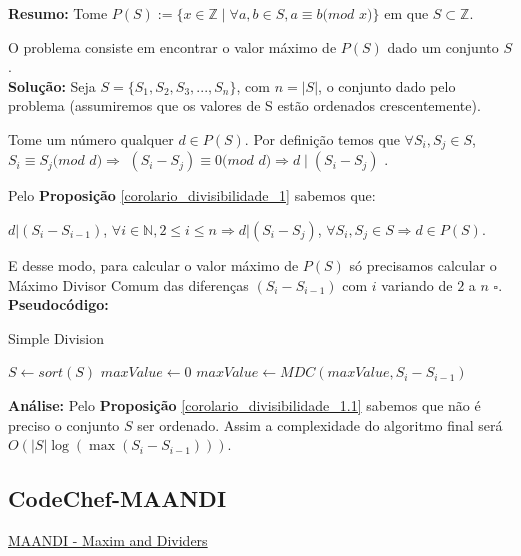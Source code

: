 \textbf{Resumo:} 
Tome $P(S) := \{ x \in \mathbb{Z} \mid  \forall a , b \in S , a \equiv b ( mod$ $x)\}$ em que $S \subset \mathbb{Z}$.

O problema consiste em encontrar o valor máximo de $P(S)$ dado um conjunto $S$.
\\

\textbf{Solução:} 
Seja $S = \{S_1, S_2, S_3, ..., S_n\}$, com $n = |S|$, o conjunto dado pelo problema (assumiremos que os valores de S estão ordenados crescentemente).

Tome um número qualquer $d \in P(S)$. Por definição temos que $\forall S_i, S_j \in S$, $S_i \equiv S_j ( mod$ $d) \Rightarrow $ 
$ (S_i-S_j) \equiv 0 ( mod$ $d) \Rightarrow d \mid (S_i-S_j)$ .

Pelo \textbf{Proposição} \autoref{corolario_divisibilidade_1} sabemos que:

$d | (S_i-S_{i-1})$, $ \forall i \in \mathbb{N}, 2 \leq i \leq n \Rightarrow d | (S_i-S_j)$, $ \forall S_i, S_j \in S \Rightarrow d \in P(S)$.

E desse modo, para calcular o valor máximo de $P(S)$ só precisamos calcular o Máximo Divisor Comum das diferenças $(S_i-S_{i-1})$ com $i$ variando de $2$ a $n$ $\square$.
\\

\textbf{Pseudocódigo:}
\begin{algorithm}
\caption{Simple Division}\label{euclid}
\begin{algorithmic}[1]
\State $S \gets sort(S)$  
\State $maxValue \gets 0$
\State $maxValue \gets MDC(maxValue, S_i - S_{i-1})$
\EndFor
\State {}
\EndProcedure
\end{algorithmic}
\end{algorithm}

\textbf{Análise:}
Pelo \textbf{Proposição} \autoref{corolario_divisibilidade_1.1} sabemos que não é preciso o conjunto $S$ ser ordenado.
Assim a complexidade do algoritmo final será $O(|S|\log (\max (S_i-S_{i-1})))$.



\subsection{CodeChef-MAANDI}
\href{https://www.codechef.com/problems/MAANDI}{MAANDI - Maxim and Dividers}\\

